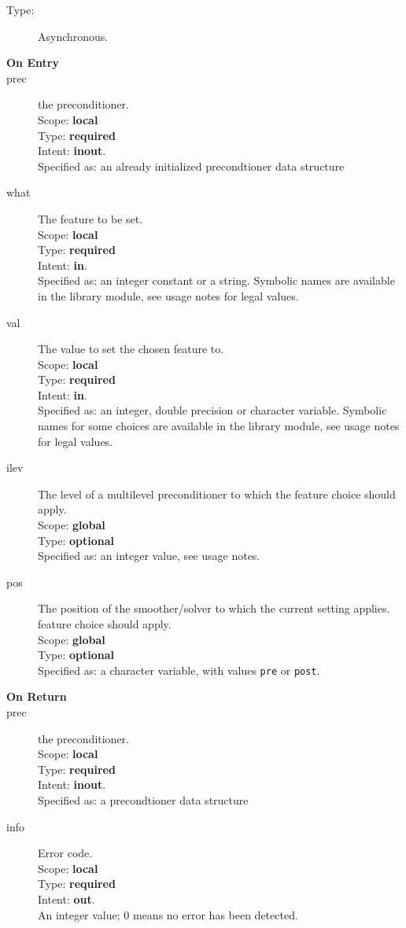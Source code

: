 \begin{description}
\item[Type:] Asynchronous.
\item[\bf On Entry]
\item[prec] the preconditioner.\\
Scope: {\bf local} \\
Type: {\bf required}\\
Intent: {\bf inout}.\\
Specified as: an already initialized precondtioner data structure \precdata\\
\item[what] The feature to be set. \\
Scope: {\bf local} \\
Type: {\bf required}\\
Intent: {\bf in}.\\
Specified as: an integer constant or a string. Symbolic names are
available in the library module, see usage notes for legal values. 
\item[val] The value  to set the chosen feature to. \\
Scope: {\bf local} \\
Type: {\bf required}\\
Intent: {\bf in}.\\
Specified as: an integer, double precision or character variable. 
Symbolic names for some choices are available in the library module,
see usage notes for legal values. 
\item[ilev] The level of a multilevel preconditioner to which the
  feature choice should apply.\\
Scope: {\bf global} \\
Type: {\bf optional}\\
Specified as: an integer value, see usage notes. 
\item[pos] The position of the smoother/solver to which the current
  setting applies.
  feature choice should apply.\\
Scope: {\bf global} \\
Type: {\bf optional}\\
Specified as: a character variable, with values \verb|pre| or \verb|post|. 
\end{description}

\begin{description}
\item[\bf On Return]
\item[prec] the preconditioner.\\
Scope: {\bf local} \\
Type: {\bf required}\\
Intent: {\bf inout}.\\
Specified as: a precondtioner data structure \precdata\\
\item[info] Error code.\\
Scope: {\bf local} \\
Type: {\bf required} \\
Intent: {\bf out}.\\
An integer value; 0 means no error has been detected. 
\end{description}

